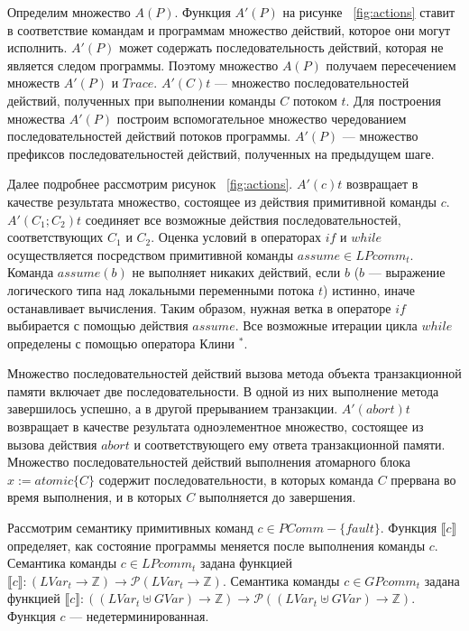 Определим множество $A(P)$. Функция $A'(P)$ на рисунке ~\ref{fig:actions} ставит в соответствие командам и программам множество действий, которое они могут исполнить. $A'(P)$ может содержать последовательность действий, которая не является следом программы. Поэтому множество $A(P)$ получаем пересечением множеств $A'(P)$ и $Trace$. $A'(C)t$ --- множество последовательностей действий, полученных при выполнении команды $C$ потоком $t$. Для построения множества $A'(P)$ построим вспомогательное множество чередованием последовательностей действий потоков программы. $A'(P)$ --- множество префиксов последовательностей действий, полученных на предыдущем шаге.

Далее подробнее рассмотрим рисунок ~\ref{fig:actions}. $A'(c)t$ возвращает в качестве результата множество, состоящее из действия примитивной команды $c$. $A'(C_1;C_2)t$ соединяет все возможные действия последовательностей, соответствующих $C_1$ и $C_2$. Оценка условий в операторах $if$ и $while$ осуществляется посредством примитивной команды $assume \in LPcomm_t$. Команда $assume(b)$ не выполняет никаких действий, если $b$ ($b$ --- выражение логического типа над локальными переменными потока $t$) истинно, иначе останавливает вычисления. Таким образом, нужная ветка в операторе $if$ выбирается с помощью действия $assume$. Все возможные итерации цикла $while$ определены с помощью оператора Клини $^*$.

Множество последовательностей действий вызова метода объекта транзакционной памяти включает две последовательности. В одной из них выполнение метода завершилось успешно, а в другой прерыванием транзакции. $A'(abort)t$ возвращает в качестве результата одноэлементное множество, состоящее из вызова действия $abort$ и соответствующего ему ответа транзакционной памяти. Множество последовательностей действий выполнения атомарного блока $x := atomic\{C\}$ содержит последовательности, в которых команда $C$ прервана во время выполнения, и в которых $C$ выполняется до завершения.

Рассмотрим семантику примитивных команд $c \in PComm - \{fault\}$. Функция $\llbracket c \rrbracket$ определяет, как состояние программы меняется после выполнения команды $c$. Семантика команды $c \in LPcomm_t$ задана функцией $\llbracket c \rrbracket: (LVar_t \to \mathbb{Z}) \to \mathcal{P}(LVar_t \to \mathbb{Z})$. Семантика команды $c \in GPcomm_t$ задана функцией $\llbracket c \rrbracket: ((LVar_t \uplus GVar) \to \mathbb{Z}) \to \mathcal{P}((LVar_t \uplus GVar)  \to \mathbb{Z})$. Функция $c$ --- недетерминированная.

